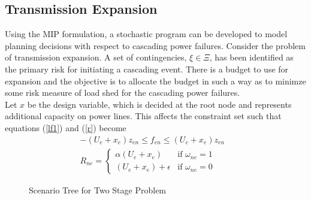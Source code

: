 \subsection{Transmission Expansion}
Using the MIP formulation, a stochastic program can be developed to model planning decisions with respect to cascading power failures.  Consider the problem of transmission expansion.  A set of contingencies, $\xi \in \Xi$, has been identified as the primary risk for initiating a cascading event.  There is a budget to use for expansion and the objective is to allocate the budget in such a way as to minimze some risk measure of load shed for the cascading power failures. \\

Let $x$ be the design variable, which is decided at the root node and represents additional capacity on power lines.  This affects the constraint set such that equations (\ref{lf1}) and (\ref{r}) become  
\begin{align}
-(U_{e}+x_e) z_{en} \le f_{en} \le (U_{e}+x_e) z_{en} &	\label{lfm}	\\
 R_{ne} = 
 \left\{ 
	\begin{array}{lr}
				\alpha (U_e + x_e) & \mbox{if } \omega_{ne}=1\\
			  (U_e + x_e) + \epsilon & \mbox{if } \omega_{ne}=0
	\end{array}
 \right. \label{rm}
\end{align}



\begin{figure}
\centering
{} 
\caption{Scenario Tree for Two Stage Problem}
  \label{fig:mip}
\end{figure}



